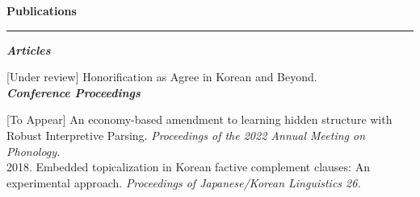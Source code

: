 \documentclass[12pt]{article}
\newcommand{\sect}[1]{{\fontsize{17}{30}\selectfont \textbf{#1}} {\vspace{0.1cm}} \hrule {\vspace{0.3cm}}}
\newcommand{\subsect}[1]{{\fontsize{14}{24}\selectfont \textit{\textbf{#1}}} {\vspace{0.3cm}}}
\begin{document}

{\vspace{1cm}}

{\sect{Publications}}

{\subsect{Articles}}

[Under review] Honorification as Agree in Korean and Beyond.\\

{\subsect{Conference Proceedings}}

{[To Appear] An economy-based amendment to learning hidden structure with Robust Interpretive Parsing. \textit{Proceedings of the 2022 Annual Meeting on Phonology.}}\\

{2018. Embedded topicalization in Korean factive complement clauses: An experimental approach. \textit{Proceedings of Japanese/Korean Linguistics 26.}}\\
\end{document}
